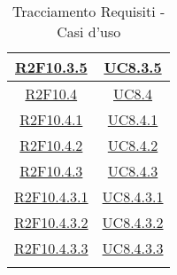 \begin{longtable}{|c|c|}
\hline
\hyperlink{R2F10.3.5}{R2F10.3.5} & \hyperlink{UC8.3.5}{UC8.3.5}\\
\hline
\hyperlink{R2F10.4}{R2F10.4} & \hyperlink{UC8.4}{UC8.4}\\
\hline
\hyperlink{R2F10.4.1}{R2F10.4.1} & \hyperlink{UC8.4.1}{UC8.4.1}\\
\hline
\hyperlink{R2F10.4.2}{R2F10.4.2} & \hyperlink{UC8.4.2}{UC8.4.2}\\
\hline
\hyperlink{R2F10.4.3}{R2F10.4.3} & \hyperlink{UC8.4.3}{UC8.4.3}\\
\hline
\hyperlink{R2F10.4.3.1}{R2F10.4.3.1} & \hyperlink{UC8.4.3.1}{UC8.4.3.1}\\
\hline
\hyperlink{R2F10.4.3.2}{R2F10.4.3.2} & \hyperlink{UC8.4.3.2}{UC8.4.3.2}\\
\hline
\hyperlink{R2F10.4.3.3}{R2F10.4.3.3} & \hyperlink{UC8.4.3.3}{UC8.4.3.3}\\
\hline
	\caption[Tracciamento Requisiti - Casi d'uso]{Tracciamento Requisiti - Casi d'uso}
	\label{tabella:requi-usecase}
\end{longtable}
\renewcommand{\arraystretch}{1}
\clearpage

